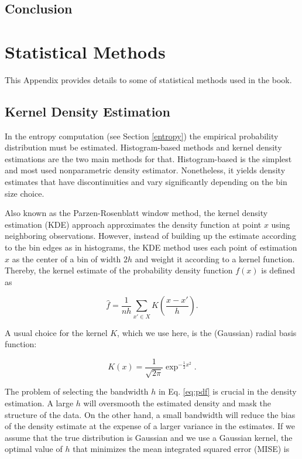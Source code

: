 \documentclass[]{book}
\theoremstyle{definition}
\theoremstyle{definition}
\theoremstyle{definition}
\theoremstyle{remark}
\begin{document}
\section{Conclusion}\label{conclusion-2}

\appendix {}


\chapter{Statistical Methods}\label{statistical-methods}

This Appendix provides details to some of statistical methods used in
the book.

\section{Kernel Density Estimation}\label{kde}

In the entropy computation (see Section \ref{entropy}) the empirical
probability distribution must be estimated. Histogram-based methods and
kernel density estimations are the two main methods for that.
Histogram-based is the simplest and most used nonparametric density
estimator. Nonetheless, it yields density estimates that have
discontinuities and vary significantly depending on the bin size choice.

Also known as the Parzen-Rosenblatt window method, the kernel density
estimation (KDE) approach approximates the density function at point
\(x\) using neighboring observations. However, instead of building up
the estimate according to the bin edges as in histograms, the KDE method
uses each point of estimation \(x\) as the center of a bin of width
\(2h\) and weight it according to a kernel function. Thereby, the kernel
estimate of the probability density function \(f(x)\) is defined as

\begin{equation}
\hat{f} = \frac{1}{nh}\sum_{x' \in X}{K\left(\frac{x - x'}{h}\right)}. 
\label{eq:pdf}
\end{equation}

A usual choice for the kernel \(K\), which we use here, is the
(Gaussian) radial basis function:

\begin{equation}
K(x) = \frac{1}{\sqrt{2\pi}}\exp^{-\frac{1}{2}x^2}. 
\end{equation}

The problem of selecting the bandwidth \(h\) in Eq. \eqref{eq:pdf} is
crucial in the density estimation. A large \(h\) will oversmooth the
estimated density and mask the structure of the data. On the other hand,
a small bandwidth will reduce the bias of the density estimate at the
expense of a larger variance in the estimates. If we assume that the
true distribution is Gaussian and we use a Gaussian kernel, the optimal
value of \(h\) that minimizes the mean integrated squared error (MISE)
is
\end{document}
